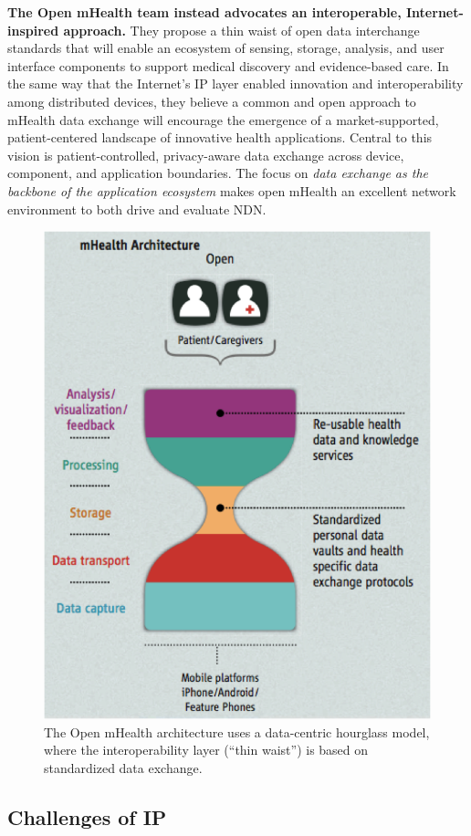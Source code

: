 \textbf{The Open mHealth team instead advocates an interoperable,  Internet-inspired
approach.} They propose a thin waist of open data interchange standards
that will enable an ecosystem of sensing, storage, analysis, and user
interface components to support medical
discovery and evidence-based care.  In the same way that the Internet's
IP layer enabled innovation and interoperability among distributed
devices, they believe a common and open approach to mHealth data exchange
will  encourage the emergence of a market-supported, patient-centered
landscape of innovative health applications. Central to this vision is
patient-controlled, privacy-aware data exchange across device, component,
and application boundaries.  The focus on \emph{data exchange as the
backbone of the application ecosystem} makes open mHealth an excellent
network environment to both drive and evaluate NDN.

\begin{figure}
\begin{center}
\includegraphics[width=.4\textwidth]{figures/mHealth-hourglass}
\caption{The Open mHealth architecture uses a data-centric hourglass model, where the interoperability layer (``thin waist'') is based on standardized data exchange.~\cite{SimEstrin2010}}
\label{fig:mHealth}
\end{center}
\end{figure}

\subsection{Challenges of IP}

